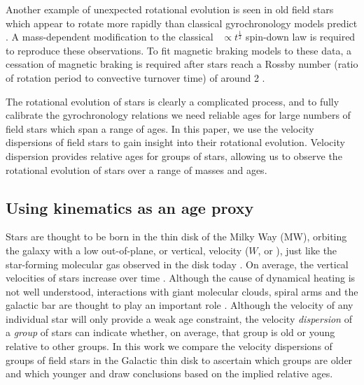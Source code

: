 Another example of unexpected rotational evolution is seen in old field stars
which appear to rotate more rapidly than classical gyrochronology models
predict \citep{angus2015, vansaders2016, vansaders2018, metcalfe2019}.
A mass-dependent modification to the classical \prot\ $\propto
t^{\frac{1}{2}}$ spin-down law \citep{skumanich1972} is required to reproduce
these observations.
To fit magnetic braking models to these data, a cessation of magnetic braking
is required after stars reach a Rossby number (ratio of rotation period to
convective turnover time) of around 2 \citep{vansaders2016, vansaders2018}.

The rotational evolution of stars is clearly a complicated process, and to
fully calibrate the gyrochronology relations we need reliable ages for large
numbers of field stars which span a range of ages.
In this paper, we use the velocity dispersions of field stars to gain insight
into their rotational evolution.
Velocity dispersion provides relative ages for groups of stars, allowing us to
observe the rotational evolution of stars over a range of masses and ages.

\subsection{Using kinematics as an age proxy}

Stars are thought to be born in the thin disk of the Milky Way (MW), orbiting
the galaxy with a low out-of-plane, or vertical, velocity ($W$, or \vz),
just like the star-forming molecular gas observed in the disk today
\citep[\eg][]{stark1989, stark2005, aumer2009, martig2014, aumer2016}.
On average, the vertical velocities of stars increase over time
\citep[\eg][]{nordstrom2004, holmberg2007, holmberg2009, aumer2009,
casagrande2011}.
Although the cause of dynamical heating is not well understood, interactions
with giant molecular clouds, spiral arms and the galactic bar are thought to
play an important role \citep[see][for a review of secular evolution in the
MW]{sellwood2014}.
Although the velocity of any individual star will only provide a weak age
constraint, the velocity {\it dispersion} of a {\it group} of stars can
indicate whether, on average, that group is old or young relative to other
groups.
In this work we compare the velocity dispersions of groups of field stars in
the Galactic thin disk to ascertain which groups are older and which younger
and draw conclusions based on the implied relative ages.

